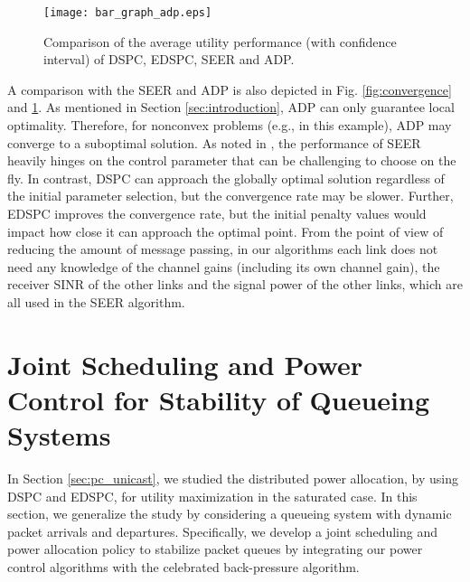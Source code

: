 \documentclass[10pt,journal,letterpaper,compsoc]{IEEEtran}
\begin{document}
{{\begin{figure}[t]
\begin{center}
\vspace{-0.0cm}\hspace{0cm} {\texttt{[image: bar\_graph\_adp.eps]}}\hspace{-0cm}
\vspace{0cm} \caption{Comparison of the average utility performance (with confidence interval) of DSPC, EDSPC, SEER and ADP.}\vspace{-0.0cm}
\label{fig:comparison}
\end{center}
\end{figure}

A comparison with the SEER and ADP is also depicted in Fig. \ref{fig:convergence} and \ref{fig:comparison}. As mentioned in Section \ref{sec:introduction}, ADP can only guarantee local optimality. Therefore, for nonconvex problems (e.g., in this example), ADP may converge to a suboptimal solution. As noted in \cite{qian:2010}, the performance of SEER heavily hinges on the control parameter that can be challenging to choose on the fly. In contrast, DSPC can approach the globally optimal solution regardless of the initial parameter selection, but the convergence rate may be slower. Further, EDSPC improves the convergence rate, but the initial penalty values would impact how close it can approach the optimal point. From the point of view of reducing the amount of message passing, in our algorithms each link does not need any knowledge of the channel gains (including its own channel gain), the receiver SINR of the other links and the signal power of the other links, which are all used in the SEER algorithm.


\section{Joint Scheduling and Power Control for Stability of Queueing Systems}\label{sec:stability}
In Section \ref{sec:pc_unicast}, we studied the distributed power allocation, by using DSPC and EDSPC, for utility maximization in the saturated case. In this section, we generalize the study by considering a queueing system with dynamic packet arrivals and departures. Specifically, we develop a joint scheduling and power allocation policy to stabilize packet queues by integrating our power control algorithms with the celebrated back-pressure algorithm\cite{ephremides:1992}.


}}
\end{document}
